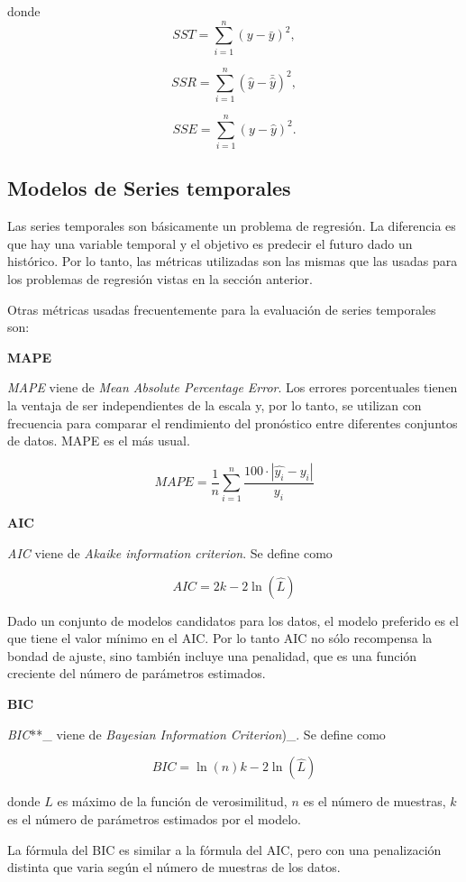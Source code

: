 \documentclass[]{book}
\begin{document}
donde \[SST = \sum_{i=1}^{n} (y - \bar{y})^2 ,\]

\[SSR = \sum_{i=1}^{n} (\hat{y} - \bar{\hat{y}})^2 ,\]

\[SSE = \sum_{i=1}^{n} (y-\hat{y})^2 .\]

\hypertarget{modelos-de-series-temporales}{%
\subsection{Modelos de Series temporales}\label{modelos-de-series-temporales}}

Las series temporales son básicamente un problema de regresión. La diferencia es que hay una variable temporal y el objetivo es predecir el futuro dado un histórico. Por lo tanto, las métricas utilizadas son las mismas que las usadas para los problemas de regresión vistas en la sección anterior.

Otras métricas usadas frecuentemente para la evaluación de series temporales son:

\textbf{MAPE}

\emph{MAPE} viene de \emph{Mean Absolute Percentage Error}. Los errores porcentuales tienen la ventaja de ser independientes de la escala y, por lo tanto, se utilizan con frecuencia para comparar el rendimiento del pronóstico entre diferentes conjuntos de datos. MAPE es el más usual.

\[MAPE = \frac{1}{n} \sum_{i=1}^{n} \frac{100·|\hat{y_i}-y_i|}{y_i}\]

\textbf{AIC}

\emph{AIC} viene de \emph{Akaike information criterion}. Se define como

\[AIC = 2k-2\ln (\hat{L})\]

Dado un conjunto de modelos candidatos para los datos, el modelo preferido es el que tiene el valor mínimo en el AIC. Por lo tanto AIC no sólo recompensa la bondad de ajuste, sino también incluye una penalidad, que es una función creciente del número de parámetros estimados.

\textbf{BIC}

\emph{BIC}**\_ viene de \emph{Bayesian Information Criterion})\_. Se define como

\[BIC = \ln (n) k - 2 \ln (\hat{L})\]

donde \(\hat{L}\) es máximo de la función de verosimilitud, \(n\) es el número de muestras, \(k\) es el número de parámetros estimados por el modelo.

La fórmula del BIC es similar a la fórmula del AIC, pero con una penalización distinta que varia según el número de muestras de los datos.
\end{document}
